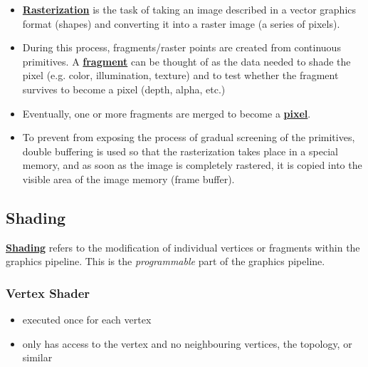 \documentclass[twocolumn,landscape,10pt]{article}
\theoremstyle{definition}
\begin{document}
\begin{itemize}
    \item \underline{\textbf{Rasterization}} is the task of taking an image 
        described in a vector graphics format (shapes) and 
        converting it into a raster image (a series of pixels).
    \item During this process, fragments/raster points are created from 
        continuous primitives.  A \underline{\textbf{fragment}} 
        can be thought of as the data needed to shade the pixel 
        (e.g. color, illumination, texture) 
        and to test whether the fragment survives to become a pixel 
        (depth, alpha, etc.)
    \item Eventually, one or more fragments are merged to become a
        \underline{\textbf{pixel}}.
    \item To prevent from exposing the process of gradual screening of the
        primitives, double buffering is used so that 
        the rasterization takes place in a special memory,
        and as soon as the image is completely rastered, 
        it is copied into the visible area of the image memory (frame buffer).
\end{itemize} 

\subsection{Shading}
\underline{\textbf{Shading}} refers to the modification of individual 
vertices or fragments within the graphics pipeline.
This is the \emph{programmable} part of the graphics pipeline.

\subsubsection{Vertex Shader}
\begin{itemize}
    \item executed once for each vertex
    \item only has access to the vertex and no neighbouring vertices,
        the topology, or similar
\end{itemize} 
\end{document}
